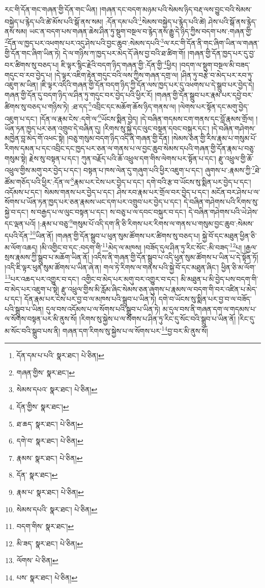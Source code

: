 རང་གི་དོན་གང་གཞན་གྱི་དོན་གང་ཡིན། །གཞན་དང་བདག་མཉམ་པའི་སེམས་ཉིད་བརྡ་ལས་བྱུང་བའི་སེམས་བསྐྱེད་པ་རྙེད་པའི་ཚེ་མོས་པའི་སྒོ་ནས་སམ། :དོན་དམ་པའི་\footnote{དོན་དམ་པ་པའི་  སྣར་ཐང་།  པེ་ཅིན། }སེམས་བསྐྱེད་པ་རྙེད་པའི་ཚེ། ཤེས་པའི་སྒོ་ནས་རྙེད་ནས་སམ། ཡང་ན་བདག་པས་གཞན་ཆེས་ཤིན་ཏུ་སྡུག་བསྔལ་བ་རྙེད་ནས་རྒྱུ་དེ་ཉིད་ཀྱིས་བདག་པས་:གཞན་གྱི་\footnote{གཞན་གྱིས་  སྣར་ཐང་། }དོན་ལ་ཁྱད་པར་འཕགས་པར་འདུ་ཤེས་པའི་བྱང་ཆུབ་:སེམས་དཔའི་\footnote{སེམས་དཔའ་  སྣར་ཐང་།  པེ་ཅིན། }ལ་རང་གི་དོན་ནི་གང་ཞིག་ཡིན་ལ་གཞན་གྱི་དོན་གང་ཞིག་ཡིན་ཏེ། དེ་ལ་གཉིས་ཀ་ཁྱད་པར་མེད་དོ་ཞེས་བྱ་བའི་ཐ་ཚིག་གོ། །གཞན་གྱི་དོན་ཁྱད་པར་དུ་བྱ་བར་ཚིགས་སུ་བཅད་པ། ཇི་ལྟར་སྙིང་རྗེའི་བདག་ཉིད་གཞན་གྱི་:དོན་གྱི་\footnote{དོན་གྱིས་  སྣར་ཐང་། }ཕྱིར། །བདག་ལ་སྡུག་བསྔལ་མི་བཟད་གདུང་བ་རབ་བྱེད་པ། །དེ་ལྟར་འཇིག་རྟེན་གདུང་བའི་ལས་ཀྱིས་གཞན་དགྲ་ལ། །ཤིན་ཏུ་བརྩེ་བ་མེད་པར་རབ་ཏུ་འཇུག་མ་ཡིན། །ཇི་ལྟར་འདིའི་གཞན་གྱི་དོན་བདག་ཉིད་ཀྱི་དོན་ལས་ཁྱད་པར་དུ་འཕགས་པ་དེ་སྒྲུབ་པར་བྱེད་དེ། གཞན་གྱི་དོན་དུ་བདག་ཉིད་ལ་ཤིན་ཏུ་གདུང་བར་བྱེད་པའི་ཕྱིར་རོ། །གཞན་གྱི་དོན་སྒྲུབ་པར་རྣམ་པར་དབྱེ་བར་ཚིགས་སུ་བཅད་པ་གཉིས་ཏེ། :ཐ་དད་\footnote{ཐ་ཆད་  སྣར་ཐང་།  པེ་ཅིན། }འབྲིང་དང་མཆོག་ཆོས་ཉིད་གནས་ལ། །ལེགས་པར་སྟོན་དང་མགུ་བྱེད་འཇུག་པ་དང་། །དོན་ལ་རྣམ་ངེས་:དགེ་ལ་\footnote{དགེ་བ་  སྣར་ཐང་།  པེ་ཅིན། }ཡོངས་སྨིན་བྱེད། །དེ་བཞིན་གདམས་ངག་གནས་དང་བློ་རྣམས་གྲོལ། །ཡོན་ཏན་ཁྱད་པར་ཅན་འགྲུབ་དེ་བཞིན་དུ། །རིགས་སུ་སྐྱེ་དང་ལུང་བསྟན་དབང་བསྐུར་དང་། །དེ་བཞིན་གཤེགས་མཁྱེན་བླ་མེད་གོ་འཕང་སྟེ། །བཅུ་གསུམ་བདག་ཉིད་འདི་ནི་གཞན་གྱི་དོན། །སེམས་ཅན་གྱི་རིས་རྣམ་པ་གསུམ་པོ་རིགས་དམན་པ་དང་འབྲིང་དང་ཁྱད་པར་ཅན་ལ་གནས་པ་ལ་བྱང་ཆུབ་སེམས་དཔའི་གཞན་གྱི་དོན་རྣམ་པ་བཅུ་གསུམ་སྟེ། རྗེས་སུ་བསྟན་པ་དང་། ཀུན་བརྗོད་པའི་ཆོ་འཕྲུལ་དག་གིས་ལེགས་པར་སྟོན་པ་དང་། རྫུ་འཕྲུལ་གྱི་ཆོ་འཕྲུལ་གྱིས་མགུ་བར་བྱེད་པ་དང་། བསྟན་པ་ཁས་ལེན་དུ་གཞུག་པའི་ཕྱིར་འཇུག་པ་དང་། ཞུགས་པ་:རྣམས་ཀྱི་\footnote{རྣམས་  སྣར་ཐང་།  པེ་ཅིན། }ཐེ་ཚོམ་གཅོད་པའི་ཕྱིར་:དོན་ལ་\footnote{དོན་  སྣར་ཐང་། }རྣམ་པར་ངེས་པར་བྱེད་པ་དང་། དགེ་བའི་རྩ་བ་ཡོངས་སུ་སྨིན་པར་བྱེད་པ་དང་། འདོམས་པ་དང་། སེམས་གནས་པར་བྱེད་པ་དང་། ཤེས་རབ་རྣམ་པར་གྲོལ་བར་བྱེད་པ་དང་། མངོན་བར་ཤེས་པ་ལ་སོགས་པ་ཡོན་ཏན་ཁྱད་པར་ཅན་རྣམས་ཡང་དག་པར་འགྲུབ་པར་བྱེད་པ་དང་། དེ་བཞིན་གཤེགས་པའི་རིགས་སུ་སྐྱེ་བ་དང་། ས་བརྒྱད་པ་ལ་ལུང་བསྟན་པ་དང་། ས་བཅུ་པ་ལ་དབང་བསྐུར་བ་དང་། དེ་བཞིན་གཤེགས་པའི་ཡེ་ཤེས་དང་ལྡན་པའོ། །:རྣམ་པ་བཅུ་\footnote{རྣམ་པ་  སྣར་ཐང་།  པེ་ཅིན། }གསུམ་པོ་འདི་དག་ནི་ཅི་རིགས་པར་རིགས་ལ་གནས་པ་གསུམ་བྱང་ཆུབ་:སེམས་དཔའི་དོན་\footnote{སེམས་དཔའི་  སྣར་ཐང་།  པེ་ཅིན། }ཡིན་ནོ། །གཞན་གྱི་དོན་སྒྲུབ་པ་ཕུན་སུམ་ཚོགས་པར་ཚིགས་སུ་བཅད་པ། སྐྱེ་བོ་དང་མཐུན་ཕྱིན་ཅི་མ་ལོག་འཆད། །མི་འགྱིང་བ་དང་:བདག་གི་\footnote{བདག་གིས་  སྣར་ཐང་། }མེད་ལ་མཁས། །བཟོད་དུལ་ཤིན་ཏུ་རིང་སོང་:མི་བཟད་\footnote{མི་ཟད་  སྣར་ཐང་།  པེ་ཅིན། }པ། །རྒྱལ་སྲས་རྣམས་ཀྱི་སྒྲུབ་པ་མཆོག་ཡིན་ནོ། །འདིས་ནི་གཞན་གྱི་དོན་སྒྲུབ་པ་འདི་ཕུན་སུམ་ཚོགས་པ་ཡིན་པ་དེ་སྟོན་ཏོ། །འདི་ཇི་ལྟར་ཕུན་སུམ་ཚོགས་པ་ཡིན་ཞེ་ན། གལ་ཏེ་རིགས་ལ་གནས་པའི་སྐྱེ་བོ་དང་མཐུན་ཞིང་། ཕྱིན་ཅི་མ་ལོག་\footnote{ལོགས་  པེ་ཅིན། }པར་འཆད་པར་འགྱུར་བ་དང་། འགྱིང་བ་མེད་པར་མགུ་བར་འགྱུར་བ་དང་། མི་མཐུན་པ་མི་བྱེད་པས་བདག་གི་བ་མེད་པར་འཇུག་པ་སྟེ། རྫུ་འཕྲུལ་གྱིས་མི་རློམ་ཞིང་སེམས་ཅན་ཞུགས་པ་རྣམས་ལ་བདག་གི་བར་འཛིན་པ་མེད་པ་དང་། དོན་རྣམ་པར་ངེས་པར་བྱ་བ་ལ་མཁས་པའི་སྒྲུབ་པ་ཡིན་ཏེ། དགེ་བ་ཡོངས་སུ་སྨིན་པར་བྱ་བ་ལ་བཟོད་པའི་སྒྲུབ་པ་ཡིན། དུལ་བས་འདོམས་པ་ལ་སོགས་པའི་སྒྲུབ་པ་ཡིན་ཏེ། མ་དུལ་བས་ནི་གཞན་དག་ལ་གདམས་པ་ལ་སོགས་བསྟན་པར་མི་ནུས་སོ། །རིགས་སུ་སྐྱེས་པ་ལ་སོགས་པ་ཤིན་ཏུ་རིང་དུ་སོང་བའི་སྒྲུབ་པ་ཡིན་ནོ། །རིང་དུ་མ་སོང་བའི་སྒྲུབ་པས་ནི། གཞན་དག་རིགས་སུ་སྐྱེས་པ་ལ་སོགས་པར་\footnote{པས་  སྣར་ཐང་།  པེ་ཅིན། }བྱ་བར་མི་ནུས་སོ། 